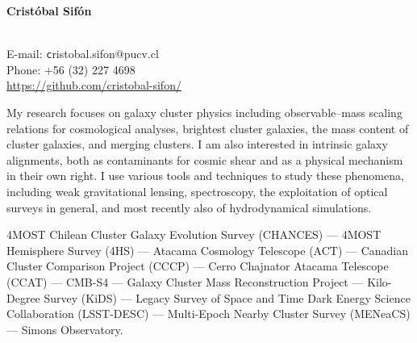 \documentclass[11pt]{article}
\begin{document}
\begin{minipage}[b]{0.46\linewidth}
\flushleft
\hspace{-0.7cm}
{\bf\huge Crist\'obal Sif\'on}\\\vspace{0.2cm}
\\
\end{minipage}
\begin{minipage}[b]{0.49\linewidth}
\flushright
{\large E-mail: {\texttt cristobal.sifon@pucv.cl}\\
        Phone: +56 (32) 227 4698\\
        \url{https://github.com/cristobal-sifon/}}
\end{minipage}
\vspace{0.4cm}
\hline




My research focuses on galaxy cluster physics including observable--mass scaling 
relations for cosmological analyses, brightest cluster galaxies, the mass 
content of cluster galaxies, and merging clusters. I am also interested in 
intrinsic galaxy alignments, both as contaminants for cosmic shear and as a 
physical mechanism in their own right. I use various tools and techniques to 
study these phenomena, including weak gravitational lensing, spectroscopy, the 
exploitation of optical surveys in general, and most recently also of
hydrodynamical simulations.

\vspace{0.5cm}
{
 4MOST Chilean Cluster Galaxy Evolution Survey (CHANCES) ---
 4MOST Hemisphere Survey (4HS) ---
 Atacama Cosmology Telescope (ACT) ---
 Canadian Cluster Comparison Project (CCCP) ---
 Cerro Chajnator Atacama Telescope (CCAT) ---
 CMB-S4 ---
 Galaxy Cluster Mass Reconstruction Project ---
 Kilo-Degree Survey (KiDS) ---
 Legacy Survey of Space and Time Dark Energy Science Collaboration (LSST-DESC) ---
 Multi-Epoch Nearby Cluster Survey (MENeaCS) ---
 Simons Observatory.
}
\end{document}
